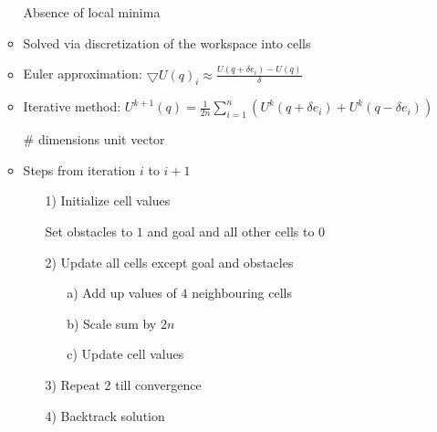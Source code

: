 \begin{itemize}
\begin{itemize}
\begin{itemize}
\begin{itemize*}
                        \end{itemize*}
                \end{itemize}
            \ipro Absence of local minima
            \item Solved via discretization of the workspace into cells
            \item Euler approximation: $\bigtriangledown U(q)_i \approx \frac{U(q + \delta e_i) - U(q)}{\delta}$
            \item Iterative method: $U^{k+1}(q) = \frac{1}{2n} \sum_{i=1}^{n} (U^k(q + \delta e_i) + U^k(q - \delta e_i))$\\
                \begin{itemize*}
                     \# dimensions
                     unit vector
                \end{itemize*}
            \item Steps from iteration $i$ to $i+1$
                \begin{itemize}
                    \item[1)] Initialize cell values
                        \begin{itemize}
                             Set obstacles to $1$ and goal and all other cells to $0$
                        \end{itemize}
                    \item[2)] Update all cells except goal and obstacles
                        \begin{itemize}
                            \item[a)] Add up values of $4$ neighbouring cells
                            \item[b)] Scale sum by $2n$
                            \item[c)] Update cell values
                        \end{itemize}
                    \item[3)] Repeat 2 till convergence
                    \item[4)] Backtrack solution
                \end{itemize}
        \end{itemize}
\end{itemize}

